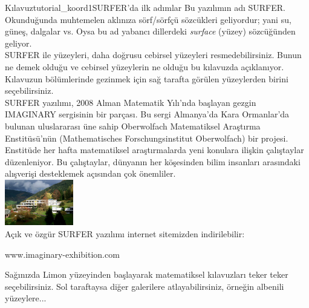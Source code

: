 \begin{surferIntroPage}{Kılavuz}{tutorial_koord1}{SURFER'da ilk adımlar}
Bu yazılımın adı SURFER. Okunduğunda muhtemelen aklınıza sörf/sörfçü sözcükleri geliyordur; yani su, güneş, dalgalar vs.  Oysa bu ad yabancı dillerdeki {\it surface} (yüzey) sözcüğünden geliyor.
\\
SURFER ile yüzeyleri, daha doğrusu cebirsel yüzeyleri resmedebilirsiniz. Bunun ne demek olduğu ve cebirsel yüzeylerin ne olduğu bu kılavuzda açıklanıyor. Kılavuzun bölümlerinde gezinmek için
sağ tarafta görülen yüzeylerden birini seçebilirsiniz.\\
SURFER yazılımı, 2008 Alman Matematik Yılı'nda başlayan gezgin IMAGINARY sergisinin bir parçası. Bu sergi Almanya'da Kara Ormanlar'da bulunan uluslararası üne sahip Oberwolfach
Matematiksel Araştırma Enstitüsü'nün (Mathematisches Forschungsinstitut Oberwolfach) bir projesi.
Enstitüde her hafta matematiksel araştırmalarda yeni konulara ilişkin çalıştaylar düzenleniyor.
Bu çalıştaylar, dünyanın her köşesinden bilim insanları arasındaki alışverişi desteklemek açısından çok önemliler. \\
\vspace{0.2cm} \hspace{3.5cm}\includegraphics[width=3cm]{./../../common/images/photo_mfo.jpg}\\
Açık ve özgür SURFER yazılımı internet sitemizden indirilebilir: \\
\begin{centering}
www.imaginary-exhibition.com\\
\end{centering}
 \vspace{0.2cm}
Sağınızda Limon yüzeyinden başlayarak matematiksel kılavuzları teker teker seçebilirsiniz.
Sol taraftaysa diğer galerilere atlayabilirsiniz, örneğin albenili yüzeylere...
\end{surferIntroPage}
